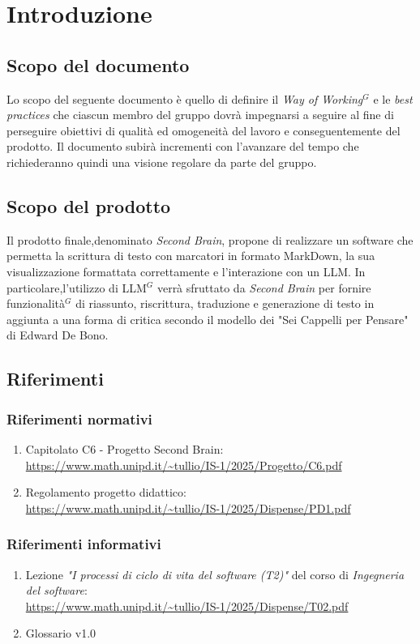 \documentclass[a4paper,10pt]{article}
\begin{document}
\newpage

\tableofcontents

\newpage

\section{Introduzione}
\subsection{Scopo del documento}
Lo scopo del seguente documento è quello di definire il \textit{Way of Working$^G$} e le \textit{best practices} che ciascun membro 
del gruppo dovrà impegnarsi a seguire al fine di perseguire obiettivi di qualità ed omogeneità del lavoro e conseguentemente
del prodotto. Il documento subirà incrementi con l'avanzare del tempo che richiederanno quindi una visione regolare da parte
del gruppo.

\subsection{Scopo del prodotto}
Il prodotto finale,denominato \textit{Second Brain}, propone di realizzare un software che permetta la scrittura di testo
con marcatori in formato MarkDown, la sua visualizzazione formattata correttamente e l'interazione con un LLM. 
In particolare,l'utilizzo di LLM$^G$ verrà sfruttato da \textit{Second Brain} per fornire funzionalità$^G$ di riassunto,
riscrittura, traduzione e generazione di testo in aggiunta a una forma di critica secondo il modello dei
"Sei Cappelli per Pensare" di Edward De Bono.  

\subsection{Riferimenti}
\subsubsection{Riferimenti normativi}
\begin{enumerate}
  \item Capitolato C6 - Progetto Second Brain: \\ \url{https://www.math.unipd.it/~tullio/IS-1/2025/Progetto/C6.pdf}
  \item Regolamento progetto didattico: \\ \url{https://www.math.unipd.it/~tullio/IS-1/2025/Dispense/PD1.pdf}
\end{enumerate}
\subsubsection{Riferimenti informativi}
\begin{enumerate}
  \item Lezione \textit{"I processi di ciclo di vita del software (T2)"} del corso di \textit{Ingegneria del software}: \\ \url{https://www.math.unipd.it/~tullio/IS-1/2025/Dispense/T02.pdf} 
  \item Glossario v1.0
\end{enumerate}
\end{document}
